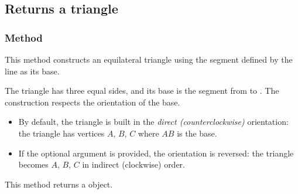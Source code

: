 \subsection{Returns a triangle}

\subsubsection{Method }
\label{ssub:method_line_equilateral}

This method constructs an equilateral triangle using the segment defined by the line as its base.

\medskip

The triangle has three equal sides, and its base is the segment from  to . The construction respects the orientation of the base.

\begin{itemize}
  \item By default, the triangle is built in the \emph{direct (counterclockwise)} orientation: the triangle has vertices $A$, $B$, $C$ where $AB$ is the base.
  \item If the optional argument  is provided, the orientation is reversed: the triangle becomes $A$, $B$, $C$ in indirect (clockwise) order.
\end{itemize}

\medskip

This method returns a  object.


\vspace{1em}
\begin{minipage}{.5\textwidth}
  \begin{center}
  \end{center}
\end{minipage}
\begin{minipage}{.5\textwidth}
\begin{tkzexample}
\end{tkzexample}
\end{minipage}

